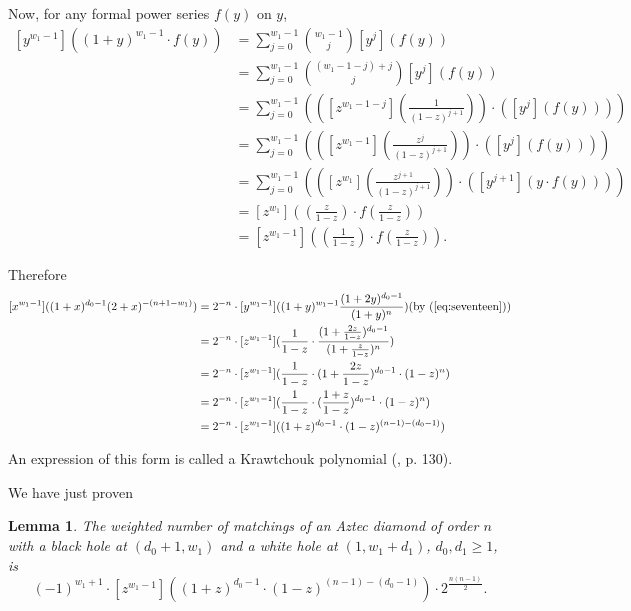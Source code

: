 \documentclass[10pt,reqno]{amsart}
\theoremstyle{plain}
\newtheorem{Lem}[Thm]{Lemma}
\theoremstyle{definition}
\theoremstyle{remark}
\begin{document}
Now, for any formal power series $f(y)$ on $y$,
\begin{equation}
\begin{aligned}
\label{eq:eighteen}
[y^{w_1-1}]((1+y)^{w_1-1}\cdot f(y)) 
&= \sum_{j=0}^{w_1-1} \binom{w_1-1}{j} [y^j](f(y)) \\
&= \sum_{j=0}^{w_1-1} \binom{(w_1-1-j)+j}{j} [y^j](f(y)) \\
&= \sum_{j=0}^{w_1-1} (([z^{w_1-1-j}](\frac{1}{(1-z)^{j+1}})) \cdot
		       ([y^j](f(y)))) \\
&= \sum_{j=0}^{w_1-1} (([z^{w_1-1}](\frac{z^j}{(1-z)^{j+1}})) \cdot
		       ([y^j](f(y)))) \\
&= \sum_{j=0}^{w_1-1} (([z^{w_1}](\frac{z^{j+1}}{(1-z)^{j+1}})) \cdot
		       ([y^{j+1}](y\cdot f(y)))) \\
&= [z^{w_1}]((\frac{z}{1-z})\cdot f(\frac{z}{1-z})) \\
&= [z^{w_1-1}]((\frac{1}{1-z})\cdot f(\frac{z}{1-z})) .
\end{aligned}
\end{equation}

Therefore
\begin{equation}
\begin{aligned}
[x^{w_1-1}]((1+x)^{d_0-1} (2+x)^{-(n+1-w_1)}) &=
2^{-n}\cdot [y^{w_1-1}]((1+y)^{w_1-1} \frac{(1+2y)^{d_0-1}}{(1+y)^n})
\text{(by (\ref{eq:seventeen}))} \\
&= 2^{-n}\cdot 
[z^{w_1-1}](\frac{1}{1-z} \cdot 
\frac{(1+\frac{2z}{1-z})^{d_0-1}}{(1+\frac{z}{1-z})^n}) \\
&= 2^{-n}\cdot 
[z^{w_1-1}](\frac{1}{1-z} \cdot 
(1+\frac{2z}{1-z})^{d_0-1} \cdot (1-z)^n) \\
&= 2^{-n}\cdot 
[z^{w_1-1}](\frac{1}{1-z} \cdot 
(\frac{1+z}{1-z})^{d_0-1} \cdot (1-z)^n) \\
&= 2^{-n}\cdot
[z^{w_1-1}]((1+z)^{d_0-1} \cdot (1-z)^{(n-1)-(d_0-1)})
\label{eq:nineteen}
\end{aligned}
\end{equation}

An expression of this form is called a Krawtchouk polynomial 
(\cite{MS}, p. 130).

We have just proven

\begin{Lem}\label{Lem:Lemur}
The weighted number of matchings of 
an Aztec diamond of order $n$ with a black hole at $(d_0+1,w_1)$ and
a white hole at $(1,w_1+d_1)$, $d_0,d_1\geq 1$, is
\[
(-1)^{w_1+1}\cdot
[z^{w_1-1}]((1+z)^{d_0-1} \cdot (1-z)^{(n-1)-(d_0-1)})\cdot
2^{\frac{n(n-1)}{2}}.
\]
\end{Lem}
\end{document}
